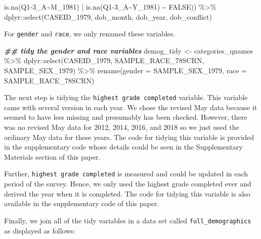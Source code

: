 \documentclass{article}
\newenvironment{Shaded}{\begin{snugshade}}{\end{snugshade}}
\newcommand{\AttributeTok}[1]{\textcolor[rgb]{0.77,0.63,0.00}{#1}}
\newcommand{\ConstantTok}[1]{\textcolor[rgb]{0.00,0.00,0.00}{#1}}
\newcommand{\DocumentationTok}[1]{\textcolor[rgb]{0.56,0.35,0.01}{\textbf{\textit{#1}}}}
\newcommand{\FunctionTok}[1]{\textcolor[rgb]{0.00,0.00,0.00}{#1}}
\newcommand{\NormalTok}[1]{#1}
\newcommand{\OtherTok}[1]{\textcolor[rgb]{0.56,0.35,0.01}{#1}}
\newcommand{\SpecialCharTok}[1]{\textcolor[rgb]{0.00,0.00,0.00}{#1}}
\newcommand{\StringTok}[1]{\textcolor[rgb]{0.31,0.60,0.02}{#1}}
\begin{document}
\begin{Shaded}
\begin{Highlighting}[]
                      \FunctionTok{is.na}\NormalTok{(}\StringTok{\textasciigrave{}}\AttributeTok{Q1{-}3\_A\textasciitilde{}M\_1981}\StringTok{\textasciigrave{}}\NormalTok{) }\SpecialCharTok{|} \FunctionTok{is.na}\NormalTok{(}\StringTok{\textasciigrave{}}\AttributeTok{Q1{-}3\_A\textasciitilde{}Y\_1981}\StringTok{\textasciigrave{}}\NormalTok{) }\SpecialCharTok{\textasciitilde{}} \ConstantTok{FALSE}\NormalTok{)) }\SpecialCharTok{\%\textgreater{}\%}
\NormalTok{  dplyr}\SpecialCharTok{::}\FunctionTok{select}\NormalTok{(CASEID\_1979,}
\NormalTok{         dob\_month,}
\NormalTok{         dob\_year,}
\NormalTok{         dob\_conflict)}
\end{Highlighting}
\end{Shaded}

For \texttt{gender} and \texttt{race}, we only renamed these variables.

\begin{Shaded}
\begin{Highlighting}[]
\DocumentationTok{\#\# tidy the gender and race variables}
\NormalTok{demog\_tidy }\OtherTok{\textless{}{-}}\NormalTok{ categories\_qnames }\SpecialCharTok{\%\textgreater{}\%}
\NormalTok{  dplyr}\SpecialCharTok{::}\FunctionTok{select}\NormalTok{(CASEID\_1979,}
\NormalTok{         SAMPLE\_RACE\_78SCRN,}
\NormalTok{         SAMPLE\_SEX\_1979) }\SpecialCharTok{\%\textgreater{}\%}
  \FunctionTok{rename}\NormalTok{(}\AttributeTok{gender =}\NormalTok{ SAMPLE\_SEX\_1979,}
         \AttributeTok{race =}\NormalTok{ SAMPLE\_RACE\_78SCRN)}
\end{Highlighting}
\end{Shaded}

The next step is tidying the \texttt{highest\ grade\ completed} variable. This variable came with several version in each year. We chose the revised May data because it seemed to have less missing and presumably has been checked. However, there was no revised May data for 2012, 2014, 2016, and 2018 so we just used the ordinary May data for these years. The code for tidying this variable is provided in the supplementary code whose details could be seen in the Supplementary Materials section of this paper.

Further, \texttt{highest\ grade\ completed} is measured and could be updated in each period of the survey. Hence, we only used the highest grade completed ever and derived the year when it is completed. The code for tidying this variable is also available in the supplementary code of this paper.

Finally, we join all of the tidy variables in a data set called \texttt{full\_demographics} as displayed as follows:
\end{document}
